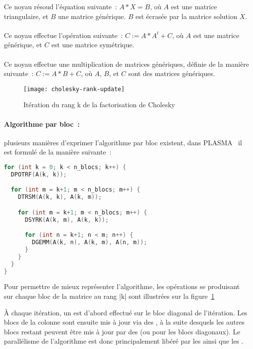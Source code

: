 Ce noyau résoud l'équation suivante~: $A*X = B$, où $A$ est une matrice triangulaire, et $B$ une matrice générique. $B$ est écrasée par la matrice solution $X$.

\paragraph{}

Ce noyau effectue l'opération suivante~: $C := A*A^t + C$, où $A$ est une matrice générique, et $C$ est une matrice symétrique.

\paragraph{}

Ce noyau effectue une multiplication de matrices génériques, définie de la manière suivante~: $C := A*B + C$, où $A$, $B$, et $C$ sont des matrices génériques.

\begin{figure}[h]
  \centering
  \texttt{[image: cholesky-rank-update]}
  \caption{Itération du rang k de la factorisation de Cholesky}\label{fig:contribs:apps:cholesky:rank-update}
\end{figure}

\paragraph{Algorithme par bloc~:} plusieurs manières d'exprimer l'algorithme par bloc existent, dans PLASMA~\cite{Kurzak2013} il est formulé de la manière suivante~:

\begin{lstlisting}[language=c++]
for (int k = 0; k < n_blocs; k++) {
  DPOTRF(A(k, k));

  for (int m = k+1; m < n_blocs; m++) {
    DTRSM(A(k, k), A(k, m));

    for (int m = k+1; m < n_blocs; m++) {
      DSYRK(A(k, m), A(k, k));

      for (int n = k+1; n < m; n++) {
        DGEMM(A(k, n), A(k, m), A(n, m));
      }
    }
  }
}
\end{lstlisting}

Pour permettre de mieux représenter l'algorithme, les opérations se produisant sur chaque bloc de la matrice au rang |k| sont illustrées sur la figure~\ref{fig:contribs:apps:cholesky:rank-update}


À chaque itération, un \potrf est d'abord effectué sur le bloc diagonal de l'itération. Les blocs de la colonne sont ensuite mis à jour via des \trsm, à la suite desquels les autres blocs restant peuvent être mis à jour par des \gemm (ou \syrk pour les blocs diagonaux).
Le parallélisme de l'algorithme est donc principalement libéré par les \potrf ainsi que les \trsm.

